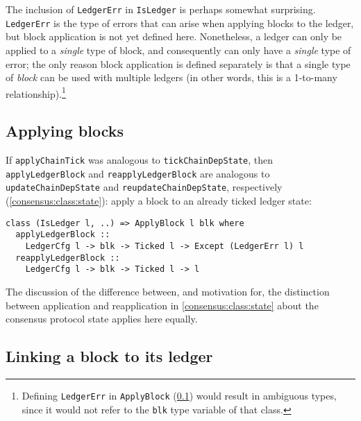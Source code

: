 The inclusion of \lstinline!LedgerErr! in \lstinline!IsLedger! is perhaps
somewhat surprising. \lstinline!LedgerErr! is the type of errors that can arise
when applying blocks to the ledger, but block application is not yet defined
here. Nonetheless, a ledger can only be applied to a \emph{single} type of
block, and consequently can only have a \emph{single} type of error; the only
reason block application is defined separately is that a single type of
\emph{block} can be used with multiple ledgers (in other words, this is a
1-to-many relationship).\footnote{Defining \lstinline!LedgerErr! in
\lstinline!ApplyBlock! (\cref{ledger:api:ApplyBlock}) would result in ambiguous
types, since it would not refer to the \lstinline!blk! type variable of that
class.}

\subsection{Applying blocks}
\label{ledger:api:ApplyBlock}

If \lstinline!applyChainTick! was analogous to \lstinline!tickChainDepState!,
then \lstinline!applyLedgerBlock! and \lstinline!reapplyLedgerBlock! are
analogous to \lstinline!updateChainDepState! and
\lstinline!reupdateChainDepState!, respectively
(\cref{consensus:class:state}): apply a block to an already ticked
ledger state:
%
\begin{lstlisting}
class (IsLedger l, ..) => ApplyBlock l blk where
  applyLedgerBlock ::
    LedgerCfg l -> blk -> Ticked l -> Except (LedgerErr l) l
  reapplyLedgerBlock ::
    LedgerCfg l -> blk -> Ticked l -> l
\end{lstlisting}
%
The discussion of the difference between, and motivation for, the distinction
between application and reapplication in \cref{consensus:class:state}
about the consensus protocol state applies here equally.

\subsection{Linking a block to its ledger}

